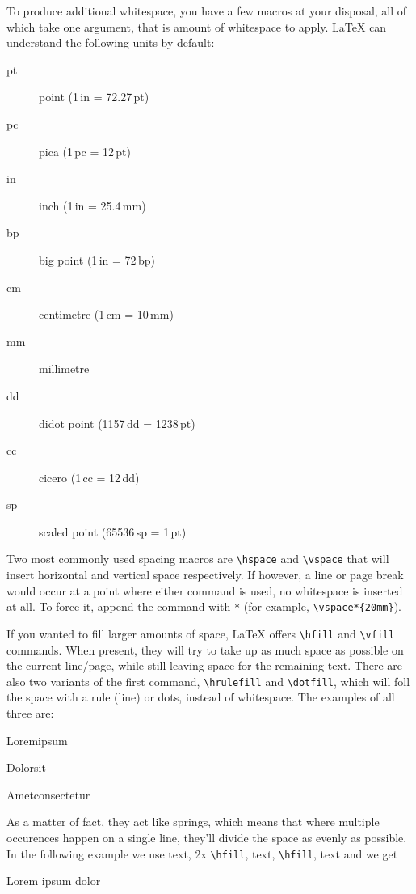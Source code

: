 To produce additional whitespace, you have a few macros at your disposal, all of which take one argument, that is amount of whitespace to apply. LaTeX can understand the following units by default:

\begin{description}
  \item[pt]  point         (1\,in = 72.27\,pt)
  \item[pc]  pica          (1\,pc = 12\,pt)
  \item[in]  inch          (1\,in = 25.4\,mm)
  \item[bp]  big point     (1\,in = 72\,bp)
  \item[cm]  centimetre    (1\,cm = 10\,mm)
  \item[mm]  millimetre
  \item[dd]  didot point   (1157\,dd = 1238\,pt)
  \item[cc]  cicero        (1\,cc = 12\,dd)
  \item[sp]  scaled point  (65536\,sp = 1\,pt)
\end{description}

Two most commonly used spacing macros are \verb|\hspace| and \verb|\vspace| that will insert horizontal and vertical space respectively. If however, a line or page break would occur at a point where either command is used, no whitespace is inserted at all. To force it, append the command with \verb|*| (for example, \verb|\vspace*{20mm}|).

If you wanted to fill larger amounts of space, LaTeX offers \verb|\hfill| and \verb|\vfill| commands. When present, they will try to take up as much space as possible on the current line/page, while still leaving space for the remaining text. There are also two variants of the first command, \verb|\hrulefill| and \verb|\dotfill|, which will foll the space with a rule (line) or dots, instead of whitespace. The examples of all three are:

Lorem\hfill ipsum

Dolor\hrulefill sit

Amet\dotfill consectetur

As a matter of fact, they act like springs, which means that where multiple occurences happen on a single line, they'll divide the space as evenly as possible. In the following example we use text, 2x \verb|\hfill|, text, \verb|\hfill|, text and we get

Lorem \hfill \hfill ipsum \hfill dolor

